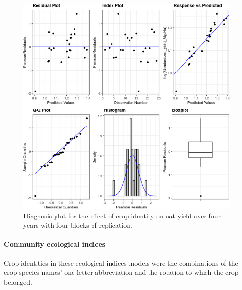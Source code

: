 \documentclass[
]{article}
\begin{document}
\begin{figure}
\centering
\includegraphics{AppendixA-model-diagnosis_files/figure-latex/oat-mod-1.png}
\caption{\label{fig:oat-mod}Diagnosis plot for the effect of crop identity on oat yield over four years with four blocks of replication.}
\end{figure}

\hypertarget{community-ecological-indices}{%
\paragraph*{Community ecological indices}\label{community-ecological-indices}}

Crop identities in these ecological indices models were the combinations of the crop species names' one-letter abbreviation and the rotation to which the crop belonged.
\end{document}
